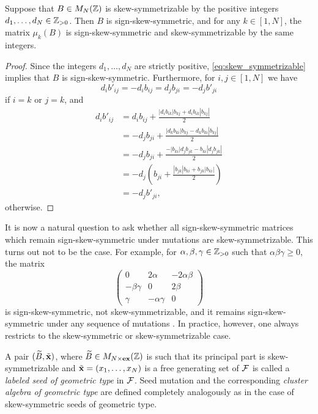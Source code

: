 \begin{proposition}\label{prop:mutation_preserves_skew_symmetrizable}
	Suppose that $B \in M_N(\mathbb{Z})$ is skew-symmetrizable by the positive integers $d_1, \dots, d_N \in \mathbb{Z}_{>0}$. Then $B$ is sign-skew-symmetric, and for any $k \in [1, N]$, the matrix $\mu_k(B)$ is sign-skew-symmetric and skew-symmetrizable by the same integers.
\end{proposition}
\begin{proof}
	Since the integers $d_1, \dots, d_N$ are strictly positive, \cref{eq:skew_symmetrizable} implies that $B$ is sign-skew-symmetric. Furthermore, for $i,j \in [1, N]$ we have
	\begin{equation*}
		d_i b'_{ij} = - d_i  b_{ij} = d_j b_{ji} = -d_j b'_{ji}
	\end{equation*}
	if $i =k$ or $j = k$, and
	\begin{align*}
		d_i b'_{ij}
		 & = d_i b_{ij} + \frac{|d_i b_{ik}|b_{kj} + d_i b_{ik}|b_{kj}|}{2}         \\
		 & = - d_j b_{ji} + \frac{|d_k b_{ki}|b_{kj} - d_k b_{ki}|b_{kj}|}{2}       \\
		 & = - d_j b_{ji} + \frac{ - |b_{ki}| d_j b_{jk} - b_{ki}|d_jb_{jk}|}{2}    \\
		 & = - d_j\left( b_{ji} + \frac{|b_{jk}|b_{ki} +  b_{jk}|b_{ki}|}{2}\right) \\
		 & = - d_jb'_{ji},
	\end{align*}
	otherwise.
\end{proof}

It is now a natural question to ask whether all sign-skew-symmetric matrices which
remain sign-skew-symmetric under mutations are skew-symmetrizable. This turns out not
to be the case. For example, for $\alpha, \beta, \gamma \in \mathbb{Z}_{>0}$ such that
$\alpha\beta\gamma \geq 0$, the matrix
\begin{equation*}
	\begin{pmatrix}
		0             & 2\alpha         & -2\alpha \beta \\
		-\beta \gamma & 0               & 2 \beta        \\
		\gamma        & - \alpha \gamma & 0
	\end{pmatrix}
\end{equation*}
%
is sign-skew-symmetric, not skew-symmetrizable, and it remains sign-skew-symmetric
under any sequence of mutations \parencite[Proposition 4.7]{FominZelevinsky2002CAF}. In practice, however, one always
restricts to the skew-symmetric or skew-symmetrizable case.
\begin{definition}\label{def:cluster_algebra_geometric_type}

	A pair $(\widetilde{B}, \tilde{\mathbf{x}})$, where $\widetilde{B} \in M_{N \times \mathbf{ex}}(\mathbb{Z})$ is such that its principal
	part is skew-symmetrizable and $\tilde{\mathbf{x}} = (x_1, \dots, x_N)$ is a free generating set of
	$\mathcal{F}$ is called a \emph{labeled seed of geometric type}
	in $\mathcal{F}$. Seed mutation and the corresponding \emph{cluster algebra of geometric
		type} are defined completely analogously as in
	the case of skew-symmetric seeds of geometric type.
\end{definition}

